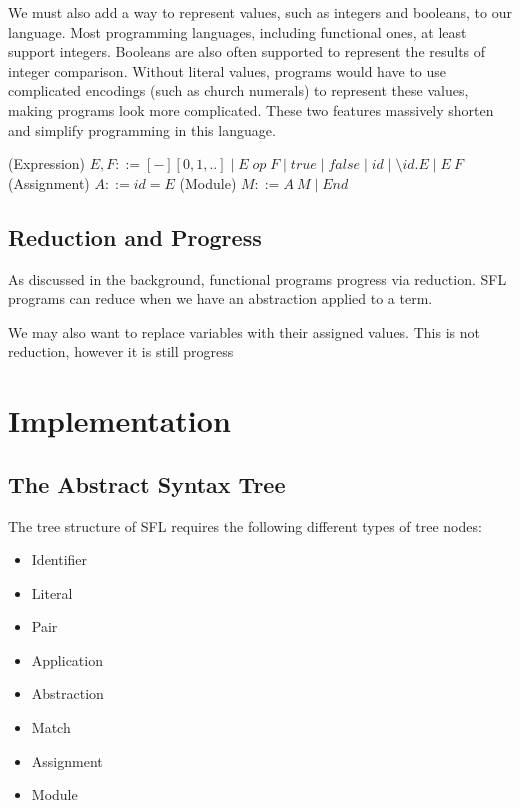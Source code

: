 We must  also add a way to represent values, such as integers and booleans, to our language. Most programming languages, including functional ones, at least support integers. Booleans are also often supported to represent the results of integer comparison. Without literal values, programs would have to use complicated encodings (such as church numerals) to represent these values, making programs look more complicated.  
These two features massively shorten and simplify programming in this language.

\begin{syntax}
(Expression) \(E, F ::= [-][0, 1, ..]\mid E\; op\; F \mid true \mid false \mid id \mid \setminus id. E \mid E\:F\)\newline
(Assignment) \(A ::= id = E\)\newline
(Module) \(M ::= A\: M \mid End\)
\end{syntax}

\subsection{Reduction and Progress}
As discussed in the background, functional programs progress via reduction. \ac{SFL}  programs can reduce when we have an abstraction applied to a term. 

We may also want to replace variables with their assigned values. This is not reduction, however it is still progress


\section{Implementation}
\subsection{The Abstract Syntax Tree}
The tree structure of \ac{SFL} requires the following different types of tree nodes:
\begin{itemize}
    \item Identifier
    \item Literal
    \item Pair
    \item Application
    \item Abstraction
    \item Match
    \item Assignment
    \item Module
\end{itemize}

